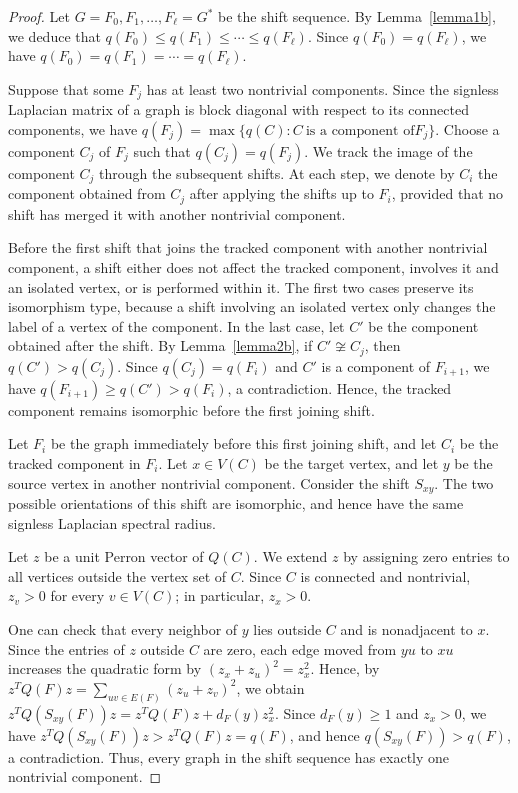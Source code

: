 \documentclass[11pt,a4paper]{article}
\theoremstyle{definition}
\numberwithin{equation}{section}
\begin{document}
\begin{proof}
Let $G=F_0,F_1,\ldots,F_\ell=G^*$ be the shift sequence. By Lemma~\ref{lemma1b}, we deduce that $q(F_0)\le q(F_1)\le\cdots\le q(F_\ell)$. Since \(q(F_0)=q(F_\ell)\), we have $q(F_0)=q(F_1)=\cdots=q(F_\ell)$.

Suppose that some \(F_j\) has at least two nontrivial components. Since the signless Laplacian matrix of a graph is block diagonal with respect to its connected components, we have \(q(F_j)=\max\{q(C): C~\text{is a component of} F_j\}\). Choose a component \(C_j\) of \(F_j\) such that \(q(C_j)=q(F_j)\). We track the image of the component $C_j$ through the subsequent
shifts. At each step, we denote by $C_i$ the component obtained from $C_j$ after applying the shifts up to $F_i$, provided that no shift has merged it with another nontrivial component.

Before the first shift that joins the tracked component with another nontrivial component, a shift either does not affect the tracked component, involves it and an isolated vertex, or is performed within it. The first two cases preserve its
isomorphism type, because a shift involving an isolated vertex only changes the label of a vertex of the component. In the last case, let $C'$ be the component obtained after the shift. By Lemma~\ref{lemma2b}, if $C'\not\cong C_j$, then
$q(C')>q(C_j)$. Since $q(C_j)=q(F_i)$ and $C'$ is a component of $F_{i+1}$, we have $q(F_{i+1})\ge q(C')>q(F_i)$, a contradiction. Hence, the tracked component remains isomorphic before the first joining shift.

Let $F_i$ be the graph immediately before this first joining shift, and let $C_i$ be the tracked component in $F_i$. Let \(x\in V(C)\) be the target vertex, and let \(y\) be the source vertex in another nontrivial component. Consider the shift \(S_{xy}\). The two possible orientations of this shift are isomorphic, and hence have the same signless Laplacian spectral radius.

Let \(z\) be a unit Perron vector of \(Q(C)\). We extend \(z\) by assigning zero entries to all vertices outside the vertex set of $C$. Since \(C\) is connected and nontrivial, \(z_v>0\) for every \(v\in V(C)\); in particular, \(z_x>0\).

One can check that every neighbor of \(y\) lies outside \(C\) and is nonadjacent to \(x\). Since the entries of $z$ outside $C$ are zero, each edge moved from $yu$ to $xu$ increases the quadratic form by $(z_x+z_u)^2=z_x^2$. Hence, by
$z^{T}Q(F)z=\sum_{uv\in E(F)}(z_u+z_v)^2$, we obtain $z^{T}Q(S_{xy}(F))z=z^{T}Q(F)z+d_F(y)z_x^2$. Since $d_F(y)\ge1$ and $z_x>0$, we have $z^{T}Q(S_{xy}(F))z>z^{T}Q(F)z=q(F)$, and hence $q(S_{xy}(F))>q(F)$, a contradiction. Thus, every graph in the shift sequence has exactly one nontrivial component.


\end{proof}
\end{document}
